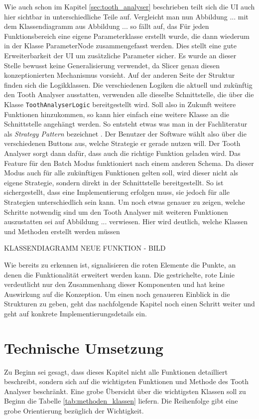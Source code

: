 Wie auch schon im Kapitel \ref{sec:tooth_analyser} beschrieben teilt sich die
\ac{UI} auch hier sichtbar in unterschiedliche Teile auf. Vergleicht man nun
Abbildung ... mit dem Klassendiagramm aus Abbildung ... so fällt auf, das Für jeden
Funktionsbereich eine eigene Parameterklasse erstellt wurde, die dann wiederum
in der Klasse ParameterNode zusammengefasst werden. Dies stellt eine gute Erweiterbarkeit
der \ac{UI} um zusätzliche Parameter sicher. Es wurde an dieser Stelle bewusst keine
Generalisierung verwendet, da Slicer genau diesen konzeptionierten Mechanismus
vorsieht. Auf der anderen Seite der Struktur finden sich die Logikklassen. Die
verschiedenen Logiken die aktuell und zukünftig den Tooth Analyser ausstatten, verwenden
alle dieselbe Schnittstelle, die über die Klasse \texttt{ToothAnalyserLogic} bereitgestellt
wird. Soll also in Zukunft weitere Funktionen hinzukommen, so kann hier einfach eine
weitere Klasse an die Schnittstelle angehängt werden. So entsteht etwas was man
in der Fachliteratur als \textit{Strategy Pattern} bezeichnet \citep[vgl.][S. ...]{siebler2014}.
Der Benutzer der Software wählt also über die verschiedenen Buttons aus, welche
Strategie er gerade nutzen will. Der Tooth Analyser sorgt dann dafür, dass auch
die richtige Funktion geladen wird. Das Feature für den Batch Modus funktioniert
nach einem anderen Schema. Da dieser Modus auch für alle zukünftigen Funktionen
gelten soll, wird dieser nicht als eigene Strategie, sondern direkt in der
Schnittstelle bereitgestellt. So ist sichergestellt, dass eine Implementierung
erfolgen muss, sie jedoch für alle Strategien unterschiedlich sein kann. Um noch
etwas genauer zu zeigen, welche Schritte notwendig sind um den Tooth Analyser mit
weiteren Funktionen auszustatten sei auf Abbildung ... verwiesen. Hier wird
deutlich, welche Klassen und Methoden erstellt werden müssen

KLASSENDIAGRAMM NEUE FUNKTION - BILD

Wie bereits zu erkennen ist, signalisieren die roten Elemente die Punkte, an denen
die Funktionalität erweitert werden kann. Die gestrichelte, rote Linie verdeutlicht
nur den Zusammenhang dieser Komponenten und hat keine Auswirkung auf die Konzeption.
Um einen noch genaueren Einblick in die Strukturen zu geben, geht das nachfolgende
Kapitel noch einen Schritt weiter und geht auf konkrete Implementierungsdetails ein.

\pagebreak

\section{Technische Umsetzung}
\label{sec:technische_umsetzung} Zu Beginn sei gesagt, dass dieses Kapitel nicht
alle Funktionen detailliert beschreibt, sondern sich auf die wichtigsten
Funktionen und Methode des Tooth Analyser beschränkt. Eine grobe Übersicht über die
wichtigsten Klassen soll zu Beginn die Tabelle \ref{tab:methoden_klassen} liefern.
Die Reihenfolge gibt eine grobe Orientierung bezüglich der Wichtigkeit.

